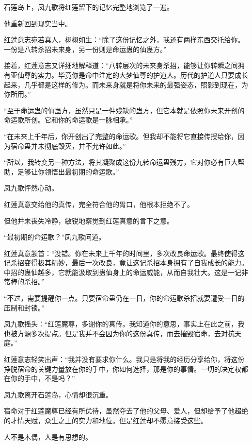 
\begin{this_body}

石莲岛上，凤九歌将红莲留下的记忆完整地浏览了一遍。

他重新回到现实当中。

红莲意志宛若真人，栩栩如生：“除了这份记忆之外，我还有两样东西交托给你。一份是八转杀招未来身，另一份则是命运蛊的仙蛊方。”

接着，红莲意志又详细地解释道：“八转层次的未来身杀招，能够让你转瞬之间拥有亚仙尊的实力。毕竟你是命中注定的大梦仙尊的护道人。历代的护道人只要成长起来，几乎都是这样的修为。而未来身就是将你未来的最强姿态，照影到现在，为你所用。”

“至于命运蛊的仙蛊方，虽然只是一件残缺的蛊方，但它本就是依照你未来开创的命运歌所创。它和你的命运歌是一脉相承。”

“在未来上千年后，你开创出了完整的命运歌。但我却不能将它直接传授给你，因为宿命蛊并未彻底毁灭，并不允许如此。”

“所以，我转变另一种方法，将其凝聚成这份九转命运蛊残方，它对你必有巨大帮助，足够让你领悟出最初期的命运歌。”

凤九歌怦然心动。

红莲真意交给他的真传，完全符合他的胃口，他根本拒绝不了。

但他并未丧失冷静，敏锐地察觉到红莲真意的言下之意。

“最初期的命运歌？”凤九歌问道。

红莲真意颔首：“没错。你在未来上千年的时间里，多次改良命运歌。最终使得这记杀招变得极其精妙，最后一次改良，竟让这记杀招本身拥有了自我成长的能力。中招的蛊仙越多，它就能汲取到蛊仙身上的命运威能，从而自我壮大。这是一记非常棒的杀招。”

“不过，需要提醒你一点。只要宿命蛊仍在一日，你的命运歌杀招就要遭受一日的压制和封锁。”

凤九歌摇头：“红莲魔尊，多谢你的真传。我知道你的意思，事实上在此之前，我也被方源多次提点。但是我并不会因为你的这份真传，而去摧毁宿命，去对抗天庭。”

红莲意志轻笑出声：“我并没有要求你什么。我只是将我的经历分享给你，将这份挣脱宿命的关键力量放在你的手中，你如何选择，那是你的事情。一切的决定权都在你的手中，不是吗？”

凤九歌离开石莲岛，心情却很沉重。

宿命对于红莲魔尊已经有所优待，虽然夺去了他的父母、爱人，但却给予了他超绝的才情天赋，众生之上的实力和地位。但是红莲却不愿意接受这些。

人不是木偶，人是有思想的。


\end{this_body}
